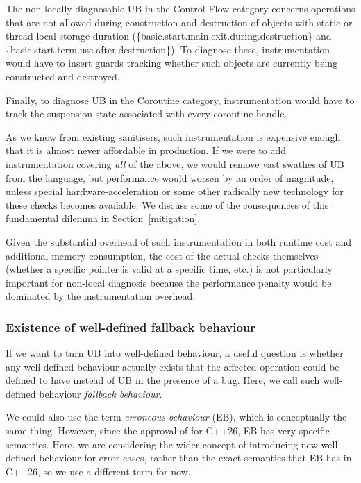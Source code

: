 The non-locally-diagnosable UB in the Control Flow category concerns operations that are not allowed during construction and destruction of objects with static or thread-local storage duration (\{basic.start.main.exit.during.destruction\} and \{basic.start.term.use.after.destruction\}). To diagnose these, instrumentation would have to insert guards tracking whether such objects are currently being constructed and destroyed.  

Finally, to diagnose UB in the Coroutine category, instrumentation would have to track the suspension state associated with every coroutine handle.

As we know from existing sanitisers, such instrumentation is expensive enough that it is almost never affordable in production. If we were to add instrumentation covering \emph{all} of the above, we would remove vast swathes of UB from the language, but performance would worsen by an order of magnitude, unless special hardware-acceleration or some other radically new technology for these checks becomes available. We discuss some of the consequences of this fundamental dilemma in Section~\ref{mitigation}.

Given the substantial overhead of such instrumentation in both runtime cost and additional memory consumption, the cost of the actual checks themselves (whether a specific pointer is valid at a specific time, etc.) is not particularly important for non-local diagnosis because the performance penalty would be dominated by the instrumentation overhead.

\subsubsection{Existence of well-defined fallback behaviour}
\label{fallback}

If we want to turn UB into well-defined behaviour, a useful question is whether any well-defined behaviour actually exists that the affected operation could be defined to have instead of UB in the presence of a bug. Here, we call such well-defined behaviour \emph{fallback behaviour}. 

We could also use the term \emph{erroneous behaviour} (EB), which is conceptually the same thing. However, since the approval of \cite{P2795R5} for C++26, EB has very specific semantics. Here, we are considering the wider concept of introducing new well-defined behaviour for error cases, rather than the exact semantics that EB has in C++26, so we use a different term for now. %

